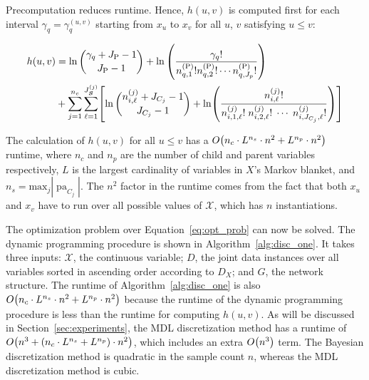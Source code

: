 \documentclass[twoside,11pt]{article}
\newcommand{\bigo}{O} %
\newcommand{\paren}[1]{\mathopen{}\mathclose\bgroup\left(#1\aftergroup\egroup\right)}
\newcommand{\brock}[1]{\mathopen{}\mathclose\bgroup\left[#1\aftergroup\egroup\right]}
\DeclareMathOperator{\Pa}{pa} %
\newcommand{\cX}{\mathcal{X}} %
\begin{document}
Precomputation reduces runtime.
Hence, $h(u,v)$ is computed first for each interval $\gamma_q = \gamma_q^{(u,v)}$ starting from $x_{u}$ to $x_{v}$ for all $u$, $v$ satisfying $u \leq v$:
\begin{small}
  \begin{equation}
  \label{eqn:h_function}
  \begin{aligned}
  h(u,v) &=  \ln {{\gamma_{q} + J_\text{P} - 1}\choose{J_\text{P}-1}} + \ln \left( { {{\gamma_q}!}\over{ {n^{(\text{P})}_{q,1} !} {n^{(\text{P})}_{q,2} !} \cdots {n^{(\text{P})}_{q,J_p} !}} } \right) \\
  & + \sum_{j=1}^{n_c} \sum_{\ell=1}^{J^{(j)}_{\bm{S}}} \brock{
    { \ln
            {{n^{(j)}_{i,\ell} + J_{C_j} - 1}\choose{J_{C_j}-1}}}
      +
      \ln \paren{ {
            \frac{
              {n^{(j)}_{i,\ell}}!
            }{
              {n^{(j)}_{i,1,\ell}!} \; {n^{(j)}_{i,2,\ell}!} \; \cdots \; {n^{(j)}_{i,J_{C_j},\ell}!}
            }
          }
          } }
  \end{aligned}
  \end{equation}
\end{small}

The calculation of $h(u,v)$ for all $u \leq v$ has a $\bigo \paren{ n_c \cdot {L}^{n_s} \cdot n^2 + {L}^{n_p} \cdot n^2 }$ runtime, where $n_c$ and $n_p$ are the number of child and parent variables respectively, $L$ is the largest cardinality of variables in $X$'s Markov blanket, and $n_s = \text{max}_j  |\Pa_{C_j}|$. The $n^2$ factor in the runtime comes from the fact that both $x_u$ and $x_v$ have to run over all possible values of $\cX$, which has $n$ instantiations.

The optimization problem over Equation~\ref{eq:opt_prob} can now be solved.
The dynamic programming procedure is shown in Algorithm~\ref{alg:disc_one}.
It takes three inputs: $\cX$, the continuous variable; $D$, the joint data instances over all variables sorted in ascending order according to $D_X$; and $G$, the network structure.
The runtime of Algorithm~\ref{alg:disc_one} is also $\bigo \paren{ n_c \cdot {L}^{n_s} \cdot n^2 + {L}^{n_p} \cdot n^2 }$ because the runtime of the dynamic programming procedure is less than the runtime for computing $h(u,v)$.
As will be discussed in Section~\ref{sec:experiments}, the MDL discretization method has a runtime of $\bigo\paren{ n^3 + \paren{ n_c \cdot {L}^{n_s} + {L}^{n_p}} \cdot n^2 }$, which includes an extra $\bigo\paren{ n^3}$ term.
The Bayesian discretization method is quadratic in the sample count $n$, whereas the MDL discretization method is cubic.
\end{document}
